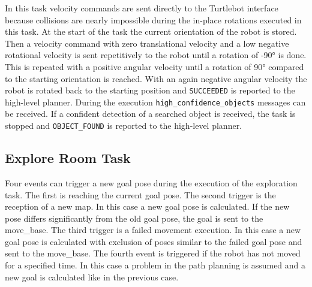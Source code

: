 In this task velocity commands are sent directly to the Turtlebot interface because collisions are nearly impossible during the in-place rotations executed in this task. At the start of the task the current orientation of the robot is stored. Then a velocity command with zero translational velocity and a low negative rotational velocity is sent repetitively to the robot until a rotation of -90° is done. This is repeated with a positive angular velocity until a rotation of 90° compared to the starting orientation is reached. With an again negative angular velocity the robot is rotated back to the starting position and \texttt{SUCCEEDED} is reported to the high-level planner. During the execution \texttt{high{\_}confidence{\_}objects} messages can be received. If a confident detection of a searched object is received, the task is stopped and \texttt{OBJECT{\_}FOUND} is reported to the high-level planner. 

\subsection{Explore Room Task}

Four events can trigger a new goal pose during the execution of the exploration task. The first is reaching the current goal pose. The second trigger is the reception of a new map. In this case a new goal pose is calculated. If the new pose differs significantly from the old goal pose, the goal is sent to the move{\_}base. The third trigger is a failed movement execution. In this case a new goal pose is calculated with exclusion of poses similar to the failed goal pose and sent to the move{\_}base. The fourth event is triggered if the robot has not moved for a specified time. In this case a problem in the path planning is assumed and a new goal is calculated like in the previous case.

